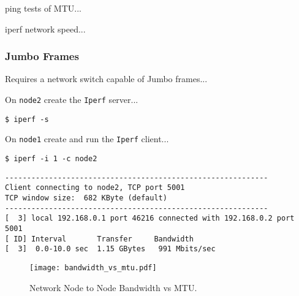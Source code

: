 ping tests of MTU...




iperf network speed...





\subsubsection{Jumbo Frames}

Requires a network switch capable of Jumbo frames...


On \verb|node2| create the \verb|Iperf| server...

\lstset{style=type}
\begin{lstlisting}
$ iperf -s
\end{lstlisting}

On \verb|node1| create and run the \verb|Iperf| client...

\lstset{style=type}
\begin{lstlisting}
$ iperf -i 1 -c node2
\end{lstlisting}

\lstset{style=type}
\begin{lstlisting}
------------------------------------------------------------
Client connecting to node2, TCP port 5001
TCP window size:  682 KByte (default)
------------------------------------------------------------
[  3] local 192.168.0.1 port 46216 connected with 192.168.0.2 port 5001
[ ID] Interval       Transfer     Bandwidth
[  3]  0.0-10.0 sec  1.15 GBytes   991 Mbits/sec
\end{lstlisting}


\begin{figure}
	\centering	
	\texttt{[image: bandwidth\_vs\_mtu.pdf]}
	\caption{Network Node to Node Bandwidth vs MTU.}
\end{figure}





